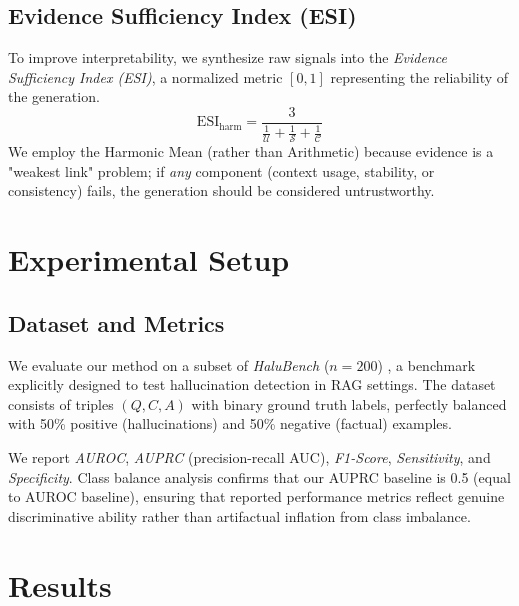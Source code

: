 \documentclass[11pt,letterpaper]{article}
\begin{document}
\subsection{Evidence Sufficiency Index (ESI)}

To improve interpretability, we synthesize raw signals into the \textit{Evidence Sufficiency Index (ESI)}, a normalized metric $[0, 1]$ representing the reliability of the generation.
\begin{equation}
    \text{ESI}_{\text{harm}} = \frac{3}{\frac{1}{\mathcal{U}} + \frac{1}{\mathcal{S}} + \frac{1}{\mathcal{C}}}
\end{equation}
We employ the Harmonic Mean (rather than Arithmetic) because evidence is a "weakest link" problem; if \textit{any} component (context usage, stability, or consistency) fails, the generation should be considered untrustworthy.

\section{Experimental Setup}

\subsection{Dataset and Metrics}
We evaluate our method on a subset of \textit{HaluBench} ($n=200$) \cite{patronusai2024halubench}, a benchmark explicitly designed to test hallucination detection in RAG settings. The dataset consists of triples $(Q, C, A)$ with binary ground truth labels, perfectly balanced with 50\% positive (hallucinations) and 50\% negative (factual) examples.

We report \textit{AUROC}, \textit{AUPRC} (precision-recall AUC), \textit{F1-Score}, \textit{Sensitivity}, and \textit{Specificity}. Class balance analysis confirms that our AUPRC baseline is 0.5 (equal to AUROC baseline), ensuring that reported performance metrics reflect genuine discriminative ability rather than artifactual inflation from class imbalance.

\section{Results}
\end{document}
